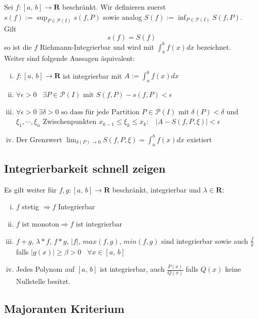 \documentclass[8pt]{extarticle}
\begin{document}
\begin{multicols*}{3}
Sei $f:[a,\,b] \rightarrow \mathbf{R}$ beschränkt. Wir definieren zuerst $s(f) := \sup_{P \in \mathcal{P}(I)} s(f, P)$ sowie analog $S(f) := \inf_{P \in \mathcal{P}(I)} S(f, P)$.\\
Gilt
$$
  s(f) = S(f)
$$
so ist die $f$ Riehmann-Integrierbar und wird mit $\int_a^b f(x)dx$ bezeichnet.\\
Weiter sind folgende Aussagen äquivalent:
\begin{enumerate}[(i)]
  \item $f:[a,\, b]\rightarrow \mathbf{R}$ ist integrierbar mit $A := \int_a^b f(x) dx$
  \item $\forall \epsilon > 0 \;\;\; \exists P \in \mathcal{P}(I) \text{ mit } S(f, P) - s(f, P) < \epsilon$
  \item $\forall \epsilon > 0 \; \exists \delta > 0 \text{ so dass für jede Partition } P \in \mathcal{P}(I) $ mit $ \delta(P) < \delta $ und $ \xi_1, \cdots, \xi_n $ Zwischenpunkten $x_{k-1} \leq \xi_k \leq x_k:\;\;\; |A - S(f, P, \xi)| < \epsilon$
  \item Der Grenzwert $\lim_{\delta(P) \rightarrow 0} S(f, P, \xi) = \int_a^b f(x)dx$ existiert
\end{enumerate}

\subsection{Integrierbarkeit schnell zeigen}

Es gilt weiter für $f,g:[a,\,b] \rightarrow \mathbf{R}$ beschränkt, integrierbar und $\lambda \in \mathbf{R}$:
\begin{enumerate}[(i)]
  \item $f$ stetig $\Rightarrow f$ Integrierbar
  \item $f\text{ ist monoton} \Rightarrow f \text{ ist integrierbar}$
  \item $f + g$, $\lambda * f$, $f * g$, $|f|$, $max(f, g)$, $min(f, g)$ sind integrierbar sowie auch $\frac{f}{g}$ falls $|g(x)| \geq \beta > 0 \;\;\; \forall x \in [a,\,b]$
  \item Jedes Polynom auf $[a,\, b]$ ist integrierbar, auch $\frac{P(x)}{Q(x)}$ falls $Q(x)$ keine Nullstelle besitzt.
\end{enumerate}

\subsection{Majoranten Kriterium}


\end{multicols*}
\end{document}
